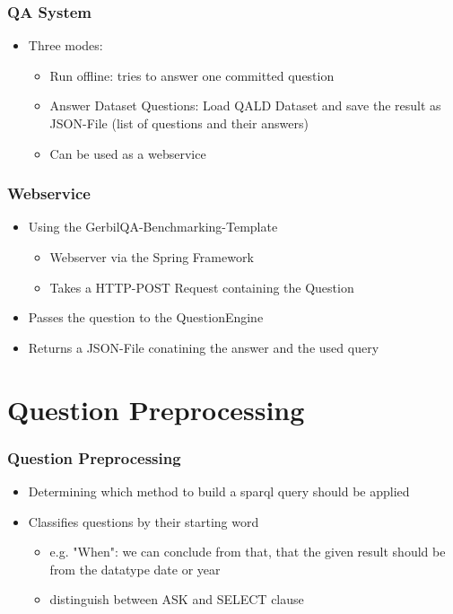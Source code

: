 \documentclass{beamer}
\begin{document}
\begin{frame}
\frametitle{QA System}
\begin{itemize}
	\item Three modes:
	\begin{itemize}		
		\item Run offline: tries to answer one committed question
		\item Answer Dataset Questions: Load QALD Dataset and save the result as JSON-File (list of questions and their answers)
		\item Can be used as a webservice
	\end{itemize}
\end{itemize}
\end{frame}

\begin{frame}
	\frametitle{Webservice}
	\begin{itemize}
		\item Using the GerbilQA-Benchmarking-Template
		\begin{itemize}
			\item Webserver via the Spring Framework
			\item Takes a HTTP-POST Request containing the Question
		\end{itemize}
		\item Passes the question to the QuestionEngine
		\item Returns a JSON-File conatining the answer and the used query
	\end{itemize}
\end{frame}

\section{Question Preprocessing}

\begin{frame}
\frametitle{Question Preprocessing}
\begin{itemize}
	\item Determining which method to build a sparql query should be applied
	\item Classifies questions by their starting word
	\begin{itemize}
		\item e.g. "When": we can conclude from that, that the given result should be from the datatype date or year
		\item distinguish between ASK and SELECT clause
	\end{itemize}
\end{itemize}
\end{frame}
\end{document}
